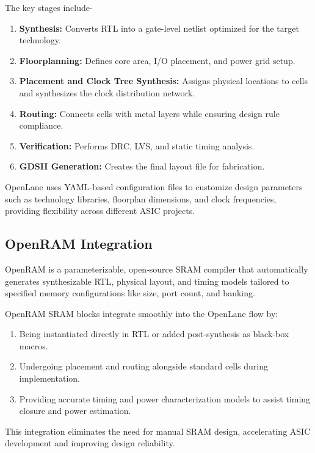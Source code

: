 The key stages include-
\begin{enumerate}
	\item \textbf{Synthesis:} Converts RTL into a gate-level netlist optimized for the target technology.
	\item \textbf{Floorplanning:} Defines core area, I/O placement, and power grid setup.
	\item \textbf{Placement and Clock Tree Synthesis:} Assigns physical locations to cells and synthesizes the clock distribution network.
	\item \textbf{Routing:} Connects cells with metal layers while ensuring design rule compliance.
	\item \textbf{Verification:} Performs DRC, LVS, and static timing analysis.
	\item \textbf{GDSII Generation:} Creates the final layout file for fabrication.
\end{enumerate}

OpenLane uses YAML-based configuration files to customize design parameters such as technology libraries, floorplan dimensions, and clock frequencies, providing flexibility across different ASIC projects.

\subsection{OpenRAM Integration}
OpenRAM is a parameterizable, open-source SRAM compiler that automatically generates synthesizable RTL, physical layout, and timing models tailored to specified memory configurations like size, port count, and banking.

OpenRAM SRAM blocks integrate smoothly into the OpenLane flow by:
\begin{enumerate}
	\item Being instantiated directly in RTL or added post-synthesis as black-box macros.
	\item Undergoing placement and routing alongside standard cells during implementation.
	\item Providing accurate timing and power characterization models to assist timing closure and power estimation.
\end{enumerate}

This integration eliminates the need for manual SRAM design, accelerating ASIC development and improving design reliability.


